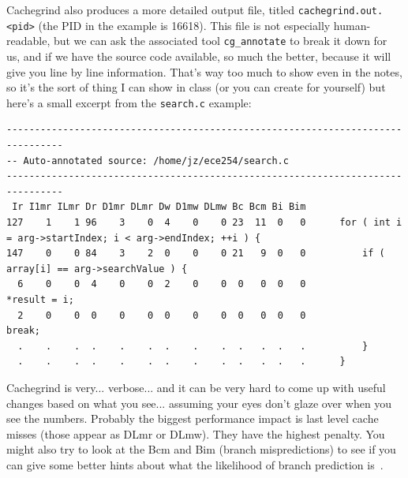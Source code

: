 Cachegrind also produces a more detailed output file, titled \texttt{cachegrind.out.<pid>} (the PID in the example is 16618). This file is not especially human-readable, but we can ask the associated tool \texttt{cg\_annotate} to break it down for us, and if we have the source code available, so much the better, because it will give you line by line information. That's way too much to show even in the notes, so it's the sort of thing I can show in class (or you can create for yourself) but here's a small excerpt from the \texttt{search.c} example:



{\scriptsize
\begin{lstlisting}
--------------------------------------------------------------------------------
-- Auto-annotated source: /home/jz/ece254/search.c
--------------------------------------------------------------------------------
 Ir I1mr ILmr Dr D1mr DLmr Dw D1mw DLmw Bc Bcm Bi Bim 
127    1    1 96    3    0  4    0    0 23  11  0   0      for ( int i = arg->startIndex; i < arg->endIndex; ++i ) {
147    0    0 84    3    2  0    0    0 21   9  0   0          if ( array[i] == arg->searchValue ) {
  6    0    0  4    0    0  2    0    0  0   0  0   0              *result = i;
  2    0    0  0    0    0  0    0    0  0   0  0   0              break;
  .    .    .  .    .    .  .    .    .  .   .  .   .          }
  .    .    .  .    .    .  .    .    .  .   .  .   .      }
\end{lstlisting}
}

Cachegrind is very... verbose... and it can be very hard to come up with useful changes based on what you see... assuming your eyes don't glaze over when you see the numbers. Probably the biggest performance impact is last level cache misses (those appear as DLmr or DLmw). They have the highest penalty. You might also try to look at the Bcm and Bim (branch mispredictions) to see if you can give some better hints about what the likelihood of branch prediction is~\cite{cachegrind}.




